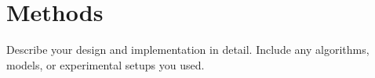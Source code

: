 \section{Methods}
Describe your design and implementation in detail. Include any algorithms, models, or experimental setups you used.